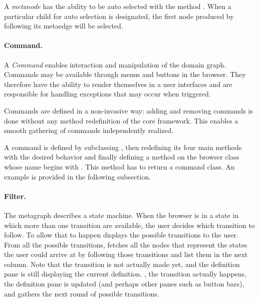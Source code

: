 \documentclass[a4paper,10pt,twoside]{book}
\begin{document}
A \emph{metanode} has the ability to be auto selected with the method . When a particular child for auto selection is designated, the first node produced by following its metaedge will be selected.

\paragraph{Command.} A \emph{Command} enables interaction and manipulation of the domain graph. Commands may be available through menus and buttons in the browser. They therefore have the ability to render themselves in a user interfaces and are responsible for handling exceptions that may occur when triggered. 

Commands are defined in a non-invasive way: adding and removing commands is done without any method redefinition of the core framework. This enables a smooth gathering of commands independently realized.

A command is defined by subclassing , then redefining its four main methods with the desired behavior and finally defining a method on the browser class whose name begins with . This method has to return a command class. An example is provided in the following subsection.

\paragraph{Filter.} 
The metagraph describes a state machine. When the browser is in a state in which more than one transition are available, the user decides which transition to follow. To allow that to happen \ob displays the possible transitions  to the user. From all the possible transitions, \obf fetches all the nodes that represent the states the user could arrive at by following those transitions and list them in the next column. Note that the transition is not actually made yet, and the definition pane is still displaying the current definition. , the transition  actually happens, the definition pane is updated (and perhaps other panes such as button bars), and \ob gathers the next round of possible transitions.

\end{document}
